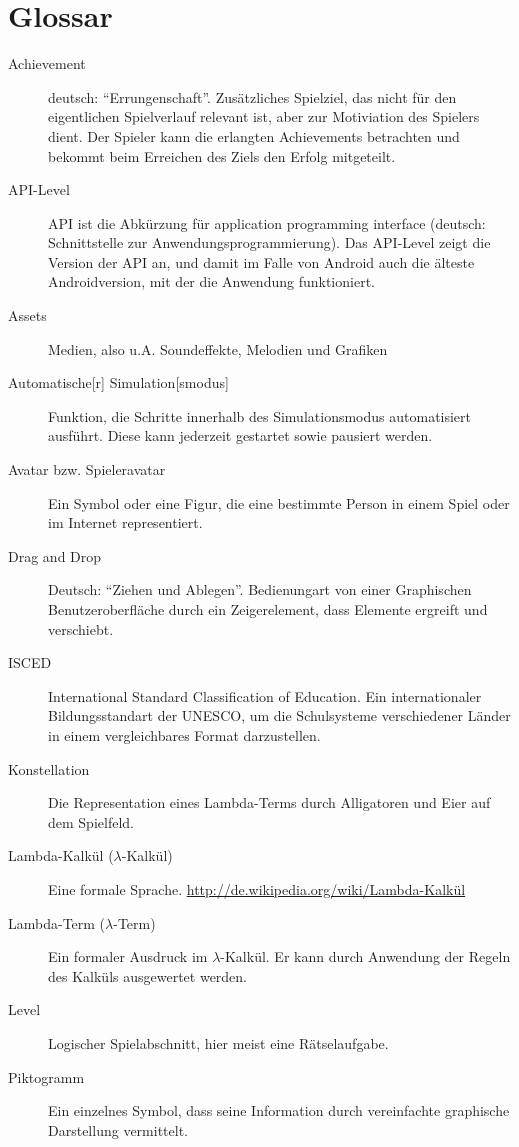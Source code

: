 \section{Glossar}
\begin{description}
	\item[Achievement] deutsch: "`Errungenschaft"'. Zusätzliches Spielziel, das nicht für den eigentlichen Spielverlauf relevant ist, aber zur Motiviation des Spielers dient.
		Der Spieler kann die erlangten Achievements betrachten und bekommt beim Erreichen des Ziels den Erfolg mitgeteilt.
	\item[API-Level] API ist die Abkürzung für application programming interface (deutsch: Schnittstelle zur Anwendungsprogrammierung).
	Das API-Level zeigt die Version der API an, und damit im Falle von Android auch die älteste Androidversion, mit der die Anwendung funktioniert.
	\item[Assets] Medien, also u.A. Soundeffekte, Melodien und Grafiken
	\item[Automatische{[}r{]} Simulation{[}smodus{]}] Funktion, die Schritte innerhalb des Simulationsmodus automatisiert ausführt. Diese kann jederzeit gestartet sowie pausiert werden.
	\item [Avatar bzw. Spieleravatar] Ein Symbol oder eine Figur, die eine bestimmte Person in einem Spiel oder im Internet representiert.
	\item [Drag and Drop] Deutsch: "`Ziehen und Ablegen"'. Bedienungart von  einer Graphischen Benutzeroberfläche durch ein Zeigerelement, dass Elemente ergreift und verschiebt.
	\item [ISCED] International Standard Classification of Education. Ein internationaler Bildungsstandart der UNESCO, um die Schulsysteme verschiedener Länder in einem vergleichbares Format darzustellen.
	\item [Konstellation] Die Representation eines Lambda-Terms durch Alligatoren und Eier auf dem Spielfeld.
	\item[Lambda-Kalkül (\(\lambda\)-Kalkül)] Eine formale Sprache. \url{http://de.wikipedia.org/wiki/Lambda-Kalkül}
	\item[Lambda-Term (\(\lambda\)-Term)] Ein formaler Ausdruck im \(\lambda\)-Kalkül.
		Er kann durch Anwendung der Regeln des Kalküls ausgewertet werden.
	\item[Level] Logischer Spielabschnitt, hier meist eine Rätselaufgabe.
	\item [Piktogramm] Ein einzelnes Symbol, dass seine Information durch vereinfachte graphische Darstellung vermittelt.

\end{description}
